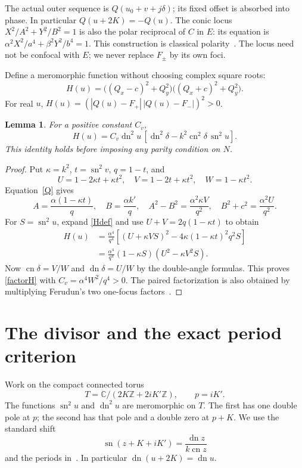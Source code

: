 \documentclass[11pt]{article}
\newcommand{\sn}{\operatorname{sn}}
\newcommand{\cn}{\operatorname{cn}}
\newcommand{\dn}{\operatorname{dn}}
\newtheorem{lemma}{Lemma}
\begin{document}
The actual outer sequence is $Q(u_0+v+j\delta)$; its fixed offset is
absorbed into phase. In particular $Q(u+2K)=-Q(u)$.
The conic locus $X^2/A^2+Y^2/B^2=1$ is also the polar reciprocal
of $C$ in $E$: its equation is
$\alpha^2X^2/a^4+\beta^2Y^2/b^4=1$.
This construction is classical polarity~\cite[Section~4]{Fouche}.
The locus need not be confocal with $E$; we never replace $F_\pm$
by its own foci.

Define a meromorphic function without choosing complex square roots:
\begin{equation}\label{Hdef}
 H(u)=\big((Q_x-c)^2+Q_y^2\big)
       \big((Q_x+c)^2+Q_y^2\big).
\end{equation}
For real $u$, $H(u)=(|Q(u)-F_+|\,|Q(u)-F_-|)^2>0$.
\begin{lemma}\label{factor}
For a positive constant $C_v$,
\begin{equation}\label{factorH}
 H(u)=C_v\dn^2u\,
       [\dn^2\delta-k^2\cn^2\delta\,\sn^2u].
\end{equation}
This identity holds before imposing any parity condition on $N$.
\end{lemma}
\begin{proof}
Put $\kappa=k^2$, $t=\sn^2v$, $q=1-t$, and
\[
 U=1-2\kappa t+\kappa t^2,\quad
 V=1-2t+\kappa t^2,\quad W=1-\kappa t^2.
\]
Equation~\eqref{Q} gives
\[
 A=\frac{\alpha(1-\kappa t)}q,\quad
 B=\frac{\alpha k'}q,\quad
 A^2-B^2=\frac{\alpha^2\kappa V}{q^2},\quad
 B^2+c^2=\frac{\alpha^2U}{q^2}.
\]
For $S=\sn^2u$, expand \eqref{Hdef} and use
$U+V=2q(1-\kappa t)$ to obtain
\begin{align*}
 H(u)&=\frac{\alpha^4}{q^4}
 [(U+\kappa VS)^2-4\kappa(1-\kappa t)^2q^2S]\\
 &=\frac{\alpha^4}{q^4}(1-\kappa S)(U^2-\kappa V^2S).
\end{align*}
Now $\cn\delta=V/W$ and $\dn\delta=U/W$ by the double-angle
formulas. This proves \eqref{factorH} with $C_v=\alpha^4W^2/q^4>0$.
The paired factorization is also obtained by multiplying Ferudun's
two one-focus factors~\cite[(5)]{Ferudun}.
\end{proof}

\section{The divisor and the exact period criterion}
Work on the compact connected torus
\[
 T=\mathbb C/(2K\mathbb Z+2iK'\mathbb Z),\qquad p=iK'.
\]
The functions $\sn^2u$ and $\dn^2u$ are meromorphic on $T$.
The first has one double pole at $p$; the second has that pole and
a double zero at $p+K$. We use the standard shift
\begin{equation}\label{shift}
 \sn(z+K+iK')=\frac{\dn z}{k\cn z}
\end{equation}
and the periods in~\cite[Tables~22.4.1--3]{DLMF}.
In particular $\dn(u+2K)=\dn u$.
\end{document}
